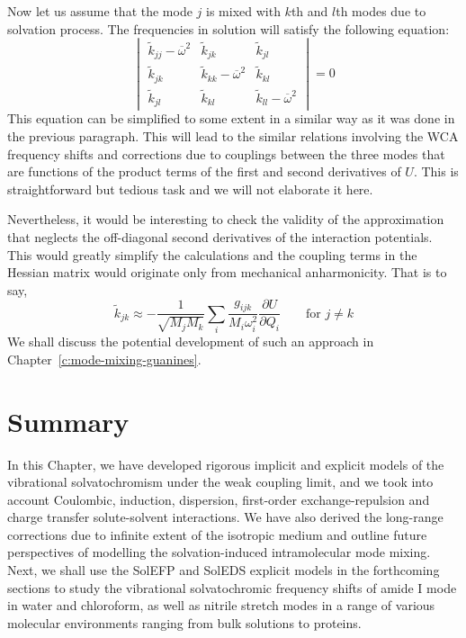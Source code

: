 \documentclass[b5paper,oneside,fleqn,11pt]{book}
\newcommand{\fderiv}[2]{\ensuremath{
    \frac{\partial #1}{\partial #2}}}
\begin{document}
\begin{refsection}
Now let us assume that the mode $j$ is mixed with $k$th and $l$th modes
due to solvation process. The frequencies in solution will satisfy the following
equation:
%
\begin{equation}
\begin{vmatrix}
\tilde{k}_{jj} - \overline{\omega}^2 & \tilde{k}_{jk}                       & \tilde{k}_{jl}                       \\ 
\tilde{k}_{jk}                       & \tilde{k}_{kk} - \overline{\omega}^2 & \tilde{k}_{kl}                       \\ 
\tilde{k}_{jl}                       & \tilde{k}_{kl}                       & \tilde{k}_{ll} - \overline{\omega}^2
\end{vmatrix}
= 0
\end{equation}
%
This equation can be simplified to some extent in a similar way
as it was done in the previous paragraph. This will lead to the
similar relations involving the WCA frequency shifts and
corrections due to couplings between the three modes that are
functions of the product terms of the first and second derivatives
of $U$. This is straightforward but tedious task and we will not
elaborate it here.

Nevertheless, it would be interesting to check the validity
of the approximation that neglects the off\hyp{}diagonal second
derivatives of the interaction potentials. This would greatly 
simplify the calculations and the coupling terms in the Hessian
matrix would originate only from mechanical anharmonicity.
That is to say,
%
\begin{equation} 
 \tilde{k}_{jk} \approx - \frac{1}{\sqrt{M_jM_k}}\sum_i  
                             \frac{g_{ijk}}{M_i\omega_i^2}\fderiv{U}{Q_i} \qquad \text{for $j\ne k$} 
\end{equation}
%
We shall discuss the potential development of such an approach
in Chapter~\ref{c:mode-mixing-guanines}.

\section{Summary}

In this Chapter, we have developed rigorous implicit and
explicit models of the vibrational solvatochromism under
the weak coupling limit, and we took into account
Coulombic, induction, dispersion, first\hyp{}order 
exchange\hyp{}repulsion and charge transfer solute\hyp{}solvent
interactions. We have also derived the long\hyp{}range
corrections due to infinite extent of the isotropic medium
and outline future perspectives of modelling the solvation\hyp{}induced
intramolecular mode mixing. 
Next, we shall use the SolEFP and SolEDS explicit models
in the forthcoming sections to study the vibrational solvatochromic
frequency shifts of amide I mode in water and chloroform, 
as well as nitrile stretch modes in a range of various molecular
environments ranging from bulk solutions to proteins.



\end{refsection}
\end{document}
